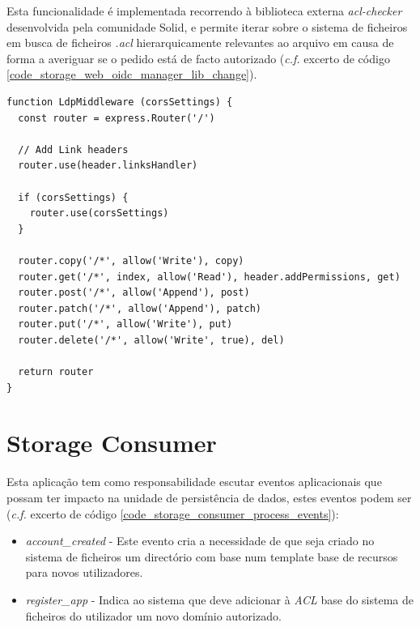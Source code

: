 Esta funcionalidade é implementada recorrendo à biblioteca externa \emph{acl-checker} desenvolvida pela comunidade Solid, e permite iterar sobre o sistema de ficheiros em busca de ficheiros \emph{.acl} hierarquicamente relevantes ao arquivo em causa de forma a averiguar se o pedido está de facto autorizado (\emph{c.f.} excerto de código \ref{code_storage_web_oidc_manager_lib_change}).

\begin{lstlisting}[caption={Alteração ao \emph{OIDCManager} na biblioteca \emph{oidc-auth-manager}}, label={code_storage_web_oidc_manager_lib_change}]
function LdpMiddleware (corsSettings) {
  const router = express.Router('/')

  // Add Link headers
  router.use(header.linksHandler)

  if (corsSettings) {
    router.use(corsSettings)
  }

  router.copy('/*', allow('Write'), copy)
  router.get('/*', index, allow('Read'), header.addPermissions, get)
  router.post('/*', allow('Append'), post)
  router.patch('/*', allow('Append'), patch)
  router.put('/*', allow('Write'), put)
  router.delete('/*', allow('Write', true), del)

  return router
}

\end{lstlisting}

\section{Storage Consumer}
Esta aplicação tem como responsabilidade escutar eventos aplicacionais que possam ter impacto na unidade de persistência de dados, estes eventos podem ser (\emph{c.f.} excerto de código \ref{code_storage_consumer_process_events}):
\begin{itemize}
    \item \emph{account\_created} - Este evento cria a necessidade de que seja criado no sistema de ficheiros um directório com base num template base de recursos para novos utilizadores.
    \item \emph{register\_app} - Indica ao sistema que deve adicionar à \emph{\acrshort{ACL}} base do sistema de ficheiros do utilizador um novo domínio autorizado.
\end{itemize}

\newpara
\newpara
\newpara
\newpara

